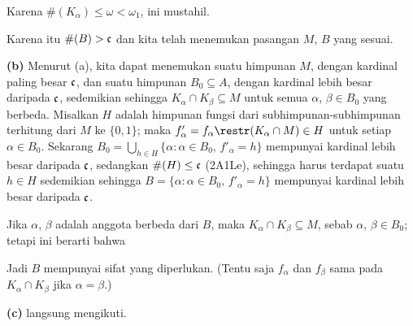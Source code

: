 {

\noindent Karena $\#(K_{\alpha})\le\omega<\omega_1$, ini mustahil.\ \Bang

Karena itu $\#(B)>\frak c$ dan kita telah menemukan pasangan $M$, $B$ yang
sesuai.

\medskip

{\bf (b)} Menurut (a), kita dapat menemukan suatu himpunan $M$, dengan
kardinal paling besar $\frak c$, dan suatu himpunan $B_0\subseteq A$, dengan
kardinal lebih besar daripada $\frak c$, sedemikian sehingga
$K_{\alpha}\cap K_{\beta}\subseteq M$ untuk semua $\alpha$,
$\beta\in B_0$ yang berbeda. Misalkan $H$ adalah himpunan fungsi dari
subhimpunan-subhimpunan terhitung dari $M$ ke $\{0,1\}$; maka
$f'_{\alpha}=f_{\alpha}\restr(K_{\alpha}\cap M)\in H$ untuk setiap
$\alpha\in B_0$. Sekarang
$B_0=\bigcup_{h\in H}\{\alpha:\alpha\in B_0,\,f'_{\alpha}=h\}$ mempunyai
kardinal lebih besar daripada $\frak c$, sedangkan $\#(H)\le\frak c$
(2A1Le), sehingga harus terdapat suatu $h\in H$ sedemikian sehingga
$B=\{\alpha:\alpha\in B_0,\,f'_{\alpha}=h\}$ mempunyai kardinal lebih besar
daripada $\frak c$.

Jika $\alpha$, $\beta$ adalah anggota berbeda dari $B$, maka
$K_{\alpha}\cap K_{\beta}\subseteq M$, sebab $\alpha$, $\beta\in B_0$;
tetapi ini berarti bahwa


\noindent Jadi $B$ mempunyai sifat yang diperlukan. (Tentu saja
$f_{\alpha}$ dan $f_{\beta}$ sama pada $K_{\alpha}\cap K_{\beta}$ jika
$\alpha=\beta$.)

\medskip

{\bf (c)} langsung mengikuti.
}%


\discrpage
